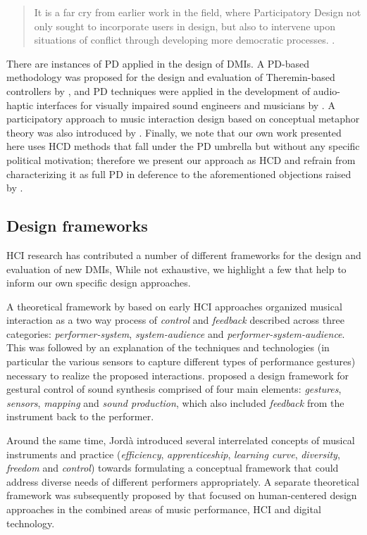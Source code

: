 \documentclass[]{interact}
\theoremstyle{plain}%
\theoremstyle{definition}
\theoremstyle{remark}
\begin{document}
\begin{quote}
    It is a far cry from earlier work in the field, where Participatory Design not only sought to incorporate users in design, but also to intervene upon situations of conflict through developing more democratic processes. \citep[p. 2]{Bannon2018}. 
\end{quote}

There are instances of PD applied in the design of DMIs. A PD-based methodology was proposed for the design and evaluation of Theremin-based controllers by \citet{Geiger2008}, and PD techniques were applied in the development of audio-haptic interfaces for visually impaired sound engineers and musicians by \citet{Metatla2016}. A participatory approach to music interaction design based on conceptual metaphor theory was also introduced by \citet{wilkie2013towards}. Finally, we note that our own work presented here uses HCD methods that fall under the PD umbrella but without any specific political motivation; therefore we present our approach as HCD and refrain from characterizing it as full PD in deference to the aforementioned objections raised by \citeauthor{Bannon2018}. 

\subsection{Design frameworks}
\label{ch3-sec:design-frameworks}

HCI research has contributed a number of different frameworks for the design and evaluation of new DMIs, While not exhaustive, we highlight a few that help to inform our own specific design approaches. 

A theoretical framework by \citet{Bongers2000a} based on early HCI approaches organized musical interaction as a two way process of \emph{control} and \emph{feedback} described across three categories: \emph{performer-system}, \emph{system-audience} and \emph{performer-system-audience}. This was followed by an explanation of the techniques and technologies (in particular the various sensors to capture different types of performance gestures) necessary to realize the proposed interactions. \citet{Wanderley2004} proposed a design framework for gestural control of sound synthesis comprised of four main elements: \emph{gestures}, \emph{sensors}, \emph{mapping} and \emph{sound production}, which also included \emph{feedback} from the instrument back to the performer. 

Around the same time, Jordà \citep*{Jorda2004, Jorda2004b} introduced several interrelated concepts of musical instruments and practice (\emph{efficiency}, \emph{apprenticeship}, \emph{learning curve}, \emph{diversity}, \emph{freedom} and \emph{control}) towards formulating a conceptual framework that could address diverse needs of different performers appropriately. A separate theoretical framework was subsequently proposed by \citet{Overholt2009} that focused on human-centered design approaches in the combined areas of music performance, HCI and digital technology.
\end{document}
